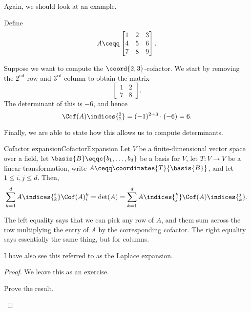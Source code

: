 Again, we should look at an example.
\begin{exm}{}{}
	Define
	\begin{equation}
		A\ceqq \begin{bmatrix}1 & 2 & 3 \\ 4 & 5 & 6 \\ 7 & 8 & 9\end{bmatrix}.
	\end{equation}
	
	Suppose we want to compute the $\coord{2,3}$-cofactor.  We start by removing the $2^{\text{nd}}$ row and $3^{\text{rd}}$ column to obtain the matrix
	\begin{equation}
		\begin{bmatrix}1 & 2 \\ 7 & 8\end{bmatrix}.
	\end{equation}
	The determinant of this is $-6$, and hence
	\begin{equation}
		\Cof (A)\indices{_2^3}=(-1)^{2+3}\cdot (-6)=6.
	\end{equation}
\end{exm}
Finally, we are able to state how this allows us to compute determinants.
\begin{crl}{Cofactor expansion}{CofactorExpansion}
	Let $V$ be a finite-dimensional vector space over a field, let $\basis{B}\eqqc \{ b_1,\ldots ,b_d\}$ be a basis for $V$, let $T\colon V\rightarrow V$ be a linear-transformation, write $A\ceqq \coordinates{T}{\basis{B}}$, and let $1\leq i,j\leq d$.  Then,
	\begin{equation}
		\sum _{k=1}^dA\indices{^i_k}\Cof (A){_i^k}=\det (A)=\sum _{k=1}^dA\indices{^k_j}\Cof (A)\indices{_k^j}.
	\end{equation}
	\begin{rmk}
		The left equality says that we can pick any row of $A$, and them sum across the row multiplying the entry of $A$ by the corresponding cofactor.  The right equality says essentially the same thing, but for columns.
	\end{rmk}
	\begin{rmk}
		I have also see this referred to as the Laplace expansion.
	\end{rmk}
	\begin{proof}
		We leave this as an exercise.
		\begin{exr}[breakable=false]{}{}
			Prove the result.
		\end{exr}
	\end{proof}
\end{crl}

